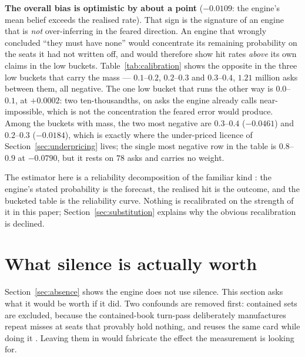 \documentclass[11pt]{article}
\begin{document}
\textbf{The overall bias is optimistic by about a point} ($-0.0109$: the engine's mean
belief exceeds the realised rate). That sign is the signature of an engine that is
\emph{not} over-inferring in the feared direction. An engine that wrongly concluded ``they
must have none'' would concentrate its remaining probability on the seats it had not
written off, and would therefore show hit rates \emph{above} its own claims in the low
buckets. Table~\ref{tab:calibration} shows the opposite in the three low buckets that
carry the mass --- $0.1$--$0.2$, $0.2$--$0.3$ and $0.3$--$0.4$, $1.21$ million asks
between them, all negative. The one low bucket that runs the other way is $0.0$--$0.1$, at
$+0.0002$: two ten-thousandths, on asks the engine already calls near-impossible, which is
not the concentration the feared error would produce. Among the buckets with mass, the two
most negative are $0.3$--$0.4$ ($-0.0461$) and $0.2$--$0.3$ ($-0.0184$), which is exactly
where the under-priced licence of Section~\ref{sec:underpricing} lives; the single most
negative row in the table is $0.8$--$0.9$ at $-0.0790$, but it rests on $78$ asks and
carries no weight.

The estimator here is a reliability decomposition of the familiar kind
\cite{murphy1973,dawid1982}: the engine's stated probability is the forecast, the realised
hit is the outcome, and the bucketed table is the reliability curve. Nothing is
recalibrated on the strength of it in this paper; Section~\ref{sec:substitution} explains
why the obvious recalibration is declined.

\section{What silence is actually worth}
\label{sec:silence}

Section~\ref{sec:absence} shows the engine does not use silence. This section asks what it
would be worth if it did. Two confounds are removed first: contained sets are excluded,
because the contained-book turn-pass deliberately manufactures repeat misses at seats that
provably hold nothing, and reuses the same card while doing it
\cite{containment,containedpaper}. Leaving them in would fabricate the effect the
measurement is looking for.
\end{document}
